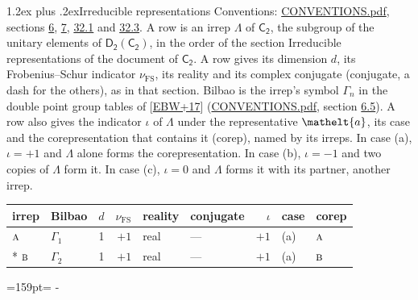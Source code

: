 \documentclass[10pt,a4paper]{article}
\makeatletter
\renewcommand\section{\@startsection{section}{1}{\z@}{-3ex plus -1ex minus -.2ex}%
  {1.2ex plus .2ex}{\normalfont\large\sffamily\bfseries\color{parttitle}}}
\newcommand{\needspace}[1]{\par\penalty-100\begingroup\dimen0=#1\relax\dimen2=\pagegoal
  \advance\dimen2-\pagetotal\ifdim\dimen0>\dimen2\relax\ifdim\dimen2>0pt\vfil\break\fi\fi
  \endgroup}
\numberwithin{equation}{section}
\newcommand{\eltfont}[1]{{\let\sigma\eltsigma\mathelt{#1}}}
\newcommand{\grp}[1]{\mathsf{#1}}
\newcommand{\irr}[1]{\text{\normalfont\scshape #1}}
\newcommand{\elt}[1]{\eltfont{#1}}
\newcommand{\fsind}{\nu_{\mathrm{FS}}}
\makeatother
\begin{document}
\section{Irreducible representations}\label{s:irreps}
Conventions: \href{../../CONVENTIONS.pdf}{CONVENTIONS.pdf}, sections \href{../../../rotation/CONVENTIONS.pdf\#conv.6}{6}, \href{../../../rotation/CONVENTIONS.pdf\#conv.7}{7}, \href{../../CONVENTIONS.pdf\#conv.32.1}{32.1} and \href{../../CONVENTIONS.pdf\#conv.32.3}{32.3}.
\leavevmode\label{n:irrep.Delta}A row is an irrep $\Lambda$ of $\grp{C_{2}}$, the subgroup of the unitary elements of $\grp{D_{2}}(\grp{C_{2}})$, in the order of the section Irreducible representations of the document of \href{../../../rotation/data/pdf/C2.pdf}{$\grp{C_{2}}$}. \label{n:index.dimension}\label{n:index.frobenius}\label{n:head.irrep}\label{n:head.reality}\label{n:head.conjugate}A row gives its dimension $d$, its Frobenius--Schur indicator $\fsind$, its reality and its complex conjugate (conjugate, a dash for the others), as in that section. \label{n:head.bilbao}\label{n:irrep.alias.gamma}Bilbao is the irrep's symbol $\Gamma_n$ in the double point group tables of [\href{../../../REFERENCES.pdf\#ref.EBW+17}{EBW+17}] (\href{../../CONVENTIONS.pdf}{CONVENTIONS.pdf}, section \href{../../../rotation/CONVENTIONS.pdf\#conv.6.5}{6.5}). \label{n:head.case.corep}\label{n:head.corep}A row also gives the indicator $\iota$ of $\Lambda$ under the representative $\elt{a}$, its case and the corepresentation that contains it (corep), named by its irreps. In case (a), $\iota = +1$ and $\Lambda$ alone forms the corepresentation. In case (b), $\iota = -1$ and two copies of $\Lambda$ form it. In case (c), $\iota = 0$ and $\Lambda$ forms it with its partner, another irrep.
\setlength{\emergencystretch}{2em}\par\setlength{\emergencystretch}{0pt}
{\small\renewcommand{\arraystretch}{1.25}\setlength{\tabcolsep}{4pt}\begin{longtable}{@{}llrrllrll@{}}\toprule
irrep & Bilbao & $d$ & $\fsind$ & reality & conjugate & $\iota$ & case & corep\\\midrule\endhead
\bottomrule\endfoot\endlastfoot
$\irr{a}$ & $\Gamma_{1}$ & 1 & $+1$ & real & --- & $+1$ & (a) & $\irr{a}$\\*
$\irr{b}$ & $\Gamma_{2}$ & 1 & $+1$ & real & --- & $+1$ & (a) & $\irr{b}$\\
\bottomrule\end{longtable}}
\needspace{159pt}
\end{document}
